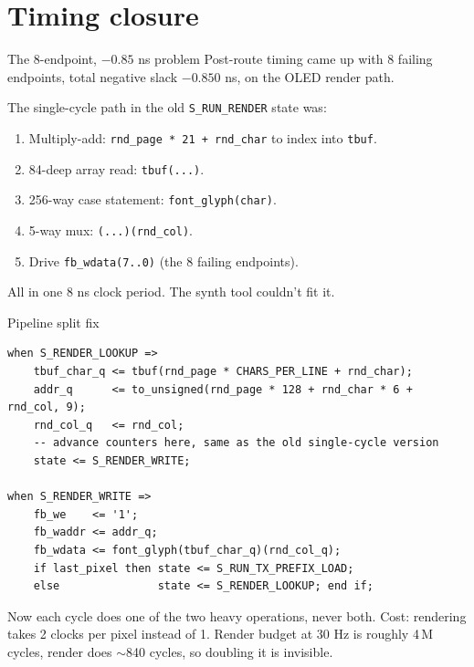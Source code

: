 \documentclass[aspectratio=169,10pt]{beamer}
\begin{document}
\section{Timing closure}

\begin{frame}{The 8-endpoint, $-0.85$ ns problem}
    Post-route timing came up with 8 failing endpoints, total
    negative slack $-0.850$ ns, on the OLED render path.

    \vspace{2mm}
    The single-cycle path in the old \texttt{S\_RUN\_RENDER} state was:
    \begin{enumerate}
        \item Multiply-add: \texttt{rnd\_page * 21 + rnd\_char} to
              index into \texttt{tbuf}.
        \item 84-deep array read: \texttt{tbuf(...)}.
        \item 256-way case statement: \texttt{font\_glyph(char)}.
        \item 5-way mux: \texttt{(...)(rnd\_col)}.
        \item Drive \texttt{fb\_wdata(7..0)} (the 8 failing endpoints).
    \end{enumerate}
    All in one 8 ns clock period. The synth tool couldn't fit it.
\end{frame}

\begin{frame}[fragile]{Pipeline split fix}
\begin{lstlisting}[style=vhdl]
when S_RENDER_LOOKUP =>
    tbuf_char_q <= tbuf(rnd_page * CHARS_PER_LINE + rnd_char);
    addr_q      <= to_unsigned(rnd_page * 128 + rnd_char * 6 + rnd_col, 9);
    rnd_col_q   <= rnd_col;
    -- advance counters here, same as the old single-cycle version
    state <= S_RENDER_WRITE;

when S_RENDER_WRITE =>
    fb_we    <= '1';
    fb_waddr <= addr_q;
    fb_wdata <= font_glyph(tbuf_char_q)(rnd_col_q);
    if last_pixel then state <= S_RUN_TX_PREFIX_LOAD;
    else               state <= S_RENDER_LOOKUP; end if;
\end{lstlisting}
    Now each cycle does one of the two heavy operations, never both.
    Cost: rendering takes 2 clocks per pixel instead of 1. Render
    budget at 30 Hz is roughly 4\,M cycles, render does $\sim$840
    cycles, so doubling it is invisible.
\end{frame}
\end{document}

